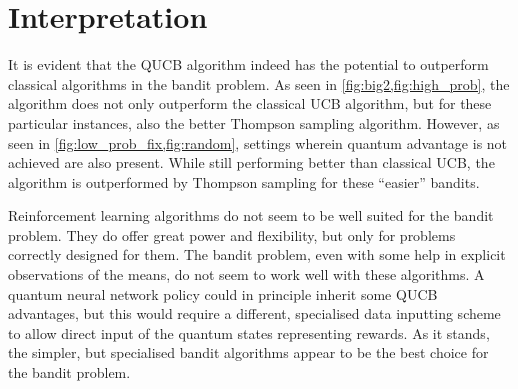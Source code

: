 \section{Interpretation}
It is evident that the QUCB algorithm indeed has the potential to outperform classical algorithms in the bandit problem.
As seen in \cref{fig:big2,fig:high_prob}, the algorithm does not only outperform the classical UCB algorithm, but for these particular instances, also the better Thompson sampling algorithm.
However, as seen in \cref{fig:low_prob_fix,fig:random}, settings wherein quantum advantage is not achieved are also present.
While still performing better than classical UCB, the algorithm is outperformed by Thompson sampling for these \enquote{easier} bandits.

Reinforcement learning algorithms do not seem to be well suited for the bandit problem.
They do offer great power and flexibility, but only for problems correctly designed for them.
The bandit problem, even with some help in explicit observations of the means, do not seem to work well with these algorithms.
A quantum neural network policy could in principle inherit some QUCB advantages, but this would require a different, specialised data inputting scheme to allow direct input of the quantum states representing rewards.
As it stands, the simpler, but specialised bandit algorithms appear to be the best choice for the bandit problem.